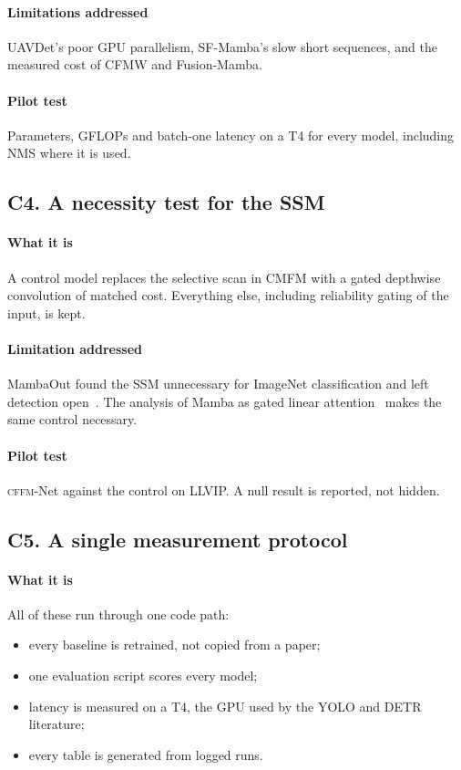\documentclass[11pt,a4paper]{article}
\newcommand{\method}{\textsc{cffm}-Net}
\begin{document}
\paragraph{Limitations addressed}
UAVDet's poor GPU parallelism, SF-Mamba's slow short sequences, and the measured cost
of CFMW and Fusion-Mamba.

\paragraph{Pilot test}
Parameters, GFLOPs and batch-one latency on a T4 for every model, including NMS where
it is used.

\subsection*{C4. A necessity test for the SSM}

\paragraph{What it is}
A control model replaces the selective scan in CMFM with a gated depthwise
convolution of matched cost. Everything else, including reliability gating of the
input, is kept.

\paragraph{Limitation addressed}
MambaOut found the SSM unnecessary for ImageNet classification and left detection
open~\citep{yu2025mambaout}. The analysis of Mamba as gated linear
attention~\citep{han2024mlla} makes the same control necessary.

\paragraph{Pilot test}
\method{} against the control on LLVIP. A null result is reported, not hidden.

\subsection*{C5. A single measurement protocol}

\paragraph{What it is}
All of these run through one code path:
\begin{itemize}
  \item every baseline is retrained, not copied from a paper;
  \item one evaluation script scores every model;
  \item latency is measured on a T4, the GPU used by the YOLO and DETR literature;
  \item every table is generated from logged runs.
\end{itemize}
\end{document}
